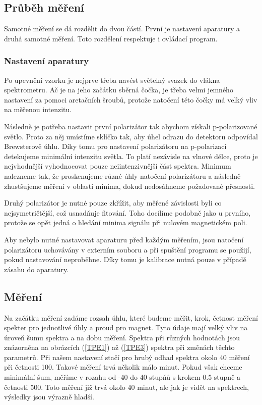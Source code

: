 \subsection{Průběh měření}
Samotné měření se dá rozdělit do dvou částí. První je nastavení aparatury a druhá samotné měření. Toto rozdělení respektuje i ovládací program.
\subsubsection{Nastavení aparatury}
Po upevnění vzorku je nejprve třeba navést světelný svazek do vlákna spektrometru. Ač je na jeho začátku sběrná čočka, je třeba velmi jemného nastavení za pomoci aretačních šroubů, protože natočení této čočky má velký vliv na měřenou intenzitu.

Následně je potřeba nastavit první polarizátor tak abychom získali p-polarizované světlo. Proto za něj umístíme sklíčko tak, aby úhel odrazu do detektoru odpovídal Brewsterově úhlu. Díky tomu pro nastavení polarizátoru na p-polarizaci detekujeme minimální intenzitu světla. To platí nezávisle na vlnové délce, proto je nejvhodnější vyhodnocovat pouze neiintenzivnější část spektra. Minimum nalezneme tak, že proskenujeme různé úhly natočení polarizátoru a následně zhustšujeme měření v oblasti minima, dokud nedosáhneme požadované přesnosti.

Druhý polarizátor je nutné pouze zkřížit, aby měřené závislosti byli co nejsymetričtější, což usnadňuje fitování. Toho docílíme podobně jako u prvního, protože se opět jedná o hledání minima signálu při nulovém magnetickém poli.

Aby nebylo nutné nastavovat aparaturu před každým měřením, jsou natočení polarizátoru uchovávány v externím souboru a při spuštění programu se použijí, pokud nastavování neproběhne. Díky tomu je kalibrace nutná pouze v případě zásahu do aparatury. 


\subsection{Měření}
Na začátku měření zadáme rozsah úhlu, které budeme měřit, krok, četnost měření spekter pro jednotlivé úhly a proud pro magnet. Tyto údaje mají velký vliv na úroveň šumu spektra a na dobu měření. Spektra při různých hodnotách jsou znázorněna na obrázcích (\ref{TPE1}) až (\ref{TPE3}) spektra při změnách těchto parametrů. Při našem nastavení stačí pro hrubý odhad spektra okolo 40 měření při četnosti 100. Takové měření trvá několik málo minut. Pokud však chceme minimální šum, měříme v rozahu od -40 do 40 stupňů s krokem 0.5 stupně a četnosti 500. Toto měření již trvá okolo 40 minut, ale jak je vidět na spektrech, výsledky jsou výrazně hladší.

